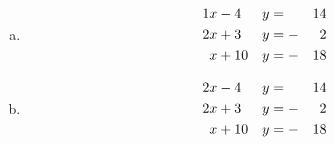 \documentclass[fleqn,leqno,12pt]{scrartcl} %
\theoremstyle{note}
\begin{document}
\begin{flushleft}
   
  \begin{multicols}{3}
    \begin{enumerate}[a)]
      
      \item 
        \begin{alignat}{3}
          \setcounter{equation}{0}
          1 & x -4 & y & = & 14 \\
          2 & x + 3 & y & = - & 2 \\
          & x + 10 & y & = - & 18 
        \end{alignat}
      
      \item 
        \begin{alignat}{3}
          \setcounter{equation}{0}
          2 & x -4 & y & = & 14 \\
          2 & x + 3 & y & = - & 2 \\
          & x + 10 & y & = - & 18 
        \end{alignat}
      
    \end{enumerate}
  \end{multicols}


\end{flushleft}
\end{document}
